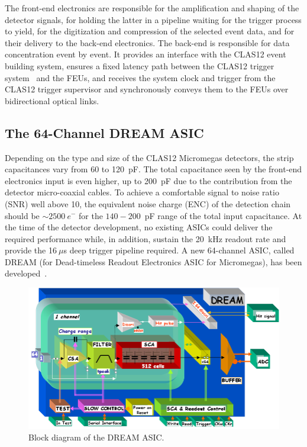 The front-end electronics are responsible for the amplification and shaping of the detector signals, for holding the latter in a
pipeline waiting for the trigger process to yield, for the digitization and compression of the selected event data, and for their
delivery to the back-end electronics. The back-end is responsible for data concentration event by event. It provides an interface
with the CLAS12 event building system, ensures a fixed latency path between the CLAS12 trigger system~\cite{trigger-nim} 
and
the FEUs, and receives the system clock and trigger from the CLAS12 trigger supervisor and synchronously conveys them to the
FEUs over bidirectional optical links.

\subsection{The 64-Channel DREAM ASIC}

Depending on the type and size of the CLAS12 Micromegas detectors, the strip capacitances vary from 60 to 120~pF. The total
capacitance seen by the front-end electronics input is even higher, up to 200~pF due to the contribution from the detector
micro-coaxial cables. To achieve a comfortable signal to noise ratio (SNR) well above 10, the equivalent noise charge (ENC) of the
detection chain should be $\sim2500~e^-$ for the $140-200$~pF range of the total input capacitance. At the time of the
detector development, no existing ASICs could deliver the required performance while, in addition, sustain the 20~kHz readout
rate and provide the 16$~\mu$s deep trigger pipeline required. A new 64-channel ASIC, called DREAM (for Dead-timeless
Readout Electronics ASIC for Micromegas), has been developed~\cite{DRM}. 

\begin{figure}[htb]
 \includegraphics[width=1.0\columnwidth,keepaspectratio]{images/electronics_fig2.png}
 \caption{Block diagram of the DREAM ASIC.}
 \label{fig:mm-e_2}
\end{figure}

